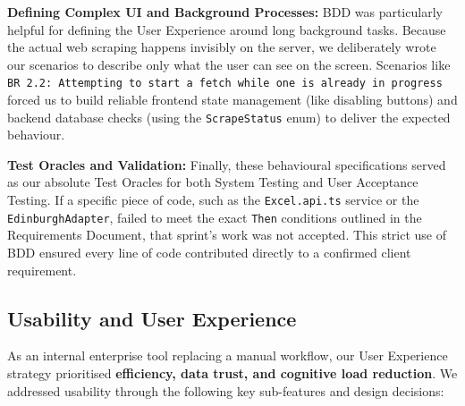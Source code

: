 \textbf{Defining Complex UI and Background Processes:} 
BDD was particularly helpful for defining the User Experience around long background tasks. Because the actual web scraping happens invisibly on the server, we deliberately wrote our scenarios to describe only what the user can see on the screen. Scenarios like \texttt{BR 2.2: Attempting to start a fetch while one is already in progress} forced us to build reliable frontend state management (like disabling buttons) and backend database checks (using the \texttt{ScrapeStatus} enum) to deliver the expected behaviour.

\textbf{Test Oracles and Validation:} 
Finally, these behavioural specifications served as our absolute Test Oracles for both System Testing and User Acceptance Testing. If a specific piece of code, such as the \texttt{Excel.api.ts} service or the \texttt{EdinburghAdapter}, failed to meet the exact \texttt{Then} conditions outlined in the Requirements Document, that sprint's work was not accepted. This strict use of BDD ensured every line of code contributed directly to a confirmed client requirement.

\subsection{Usability and User Experience}
As an internal enterprise tool replacing a manual workflow, our User Experience strategy prioritised \textbf{efficiency, data trust, and cognitive load reduction}. We addressed usability through the following key sub-features and design decisions:

